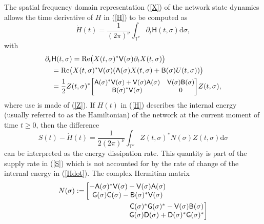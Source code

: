 \documentclass[letterpaper, 10pt, conference]{ieeeconf}  %
\def\>{\geqslant}           %
\def\d{\partial}
\def\Re{\mathrm{Re}}   %
\def\rd{\mathrm{d}}        %
\def\sH{\mathsf{H}}
\def\sA{\mathsf{A}}
\def\sB{\mathsf{B}}
\def\sC{\mathsf{C}}
\def\sD{\mathsf{D}}
\def\sV{\mathsf{V}}
\def\sG{\mathsf{G}}
\def\sB{{\sf B}}
\def\sC{{\sf C}}
\def\mT{\mathbb{T}}
\begin{document}
The spatial frequency domain representation (\ref{X}) of the network state dynamics allows the time derivative of $H$ in (\ref{H}) to be computed as
\begin{equation}
\label{Hdot}
    \dot{H}(t)
    =
    \frac{1}{(2\pi)^\nu}
    \int_{\mT^\nu}
    \d_t \sH(t,\sigma)
    \rd \sigma,
\end{equation}
with
\begin{align}
\nonumber
    \d_t &\sH(t,\sigma)
    =
    \Re
    \big(
    X(t,\sigma)^*
    \sV(\sigma)
    \d_t X(t,\sigma)
    \big)    \\
\nonumber
    &=
    \Re
    \big(
    X(t,\sigma)^*
    \sV(\sigma)
    (\sA(\sigma) X(t,\sigma) + \sB(\sigma) U(t,\sigma))
    \big)    \\
\label{Hsigmadot}
    &=
    \frac{1}{2}
    Z(t,\sigma)^*
    {\small\begin{bmatrix}
        \sA(\sigma)^* \sV(\sigma) + \sV(\sigma) \sA(\sigma) & \sV(\sigma) \sB(\sigma)\\
        \sB(\sigma)^* \sV(\sigma) & 0
    \end{bmatrix}}
    Z(t,\sigma),
\end{align}
where use is made of (\ref{Z}).
If $H(t)$ in (\ref{H}) describes the internal energy (usually   referred to as the Hamiltonian) of the network at the current moment of time $t\>0$, then the difference
\begin{equation}
\label{diff}
    S(t) - \dot{H}(t)
    =
    \frac{1}
    {2(2\pi)^{\nu}}
    \int_{\mT^\nu}
    Z(t,\sigma)^*
    N(\sigma)
    Z(t,\sigma)
    \rd \sigma
\end{equation}
can be interpreted as the energy dissipation rate. This quantity is part of the
supply rate in (\ref{S}) which is not accounted for by the rate of change of the internal energy in (\ref{Hdot}).  The complex Hermitian matrix
\begin{align}
\nonumber
    N(\sigma)
    := &
      \left[{\begin{matrix}
        -\sA(\sigma)^* \sV(\sigma) - \sV(\sigma) \sA(\sigma)\\
        \sG(\sigma) \sC(\sigma)-\sB(\sigma)^* \sV(\sigma)
    \end{matrix}}\right.\\
\label{N}
      & \qquad\qquad\qquad
      \left.{\begin{matrix}
        \sC(\sigma)^* \sG(\sigma)^*-\sV(\sigma) \sB(\sigma)\\
        \sG(\sigma) \sD(\sigma) + \sD(\sigma)^* \sG(\sigma)^*
    \end{matrix}}
    \right]
\end{align}
\end{document}
